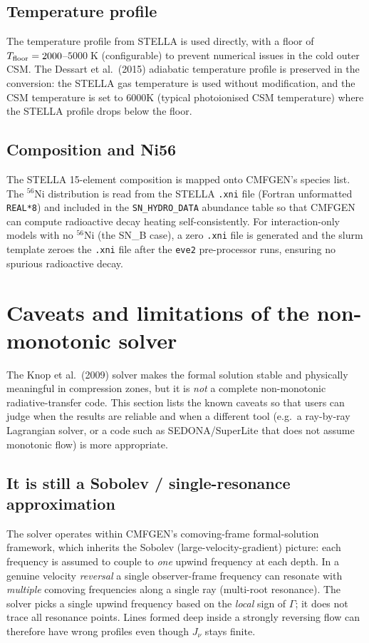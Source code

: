 \documentclass[11pt]{article}
\begin{document}
\subsection{Temperature profile}

The temperature profile from STELLA is used directly, with a floor of
$T_{\rm floor} = 2000$--$5000\;\mathrm{K}$ (configurable) to prevent
numerical issues in the cold outer CSM.  The Dessart et al.\ (2015)
adiabatic temperature profile is preserved in the conversion: the
STELLA gas temperature is used without modification, and the CSM
temperature is set to 6000\;K (typical photoionised CSM temperature)
where the STELLA profile drops below the floor.

\subsection{Composition and Ni56}

The STELLA 15-element composition is mapped onto CMFGEN's species list.
The $^{56}$Ni distribution is read from the STELLA \texttt{.xni} file
(Fortran unformatted \texttt{REAL*8}) and included in the
\texttt{SN\_HYDRO\_DATA} abundance table so that CMFGEN can compute
radioactive decay heating self-consistently.  For interaction-only
models with no $^{56}$Ni (the SN\_B case), a zero \texttt{.xni} file is
generated and the slurm template zeroes the \texttt{.xni} file after the
\texttt{eve2} pre-processor runs, ensuring no spurious radioactive
decay.

\section{Caveats and limitations of the non-monotonic solver}
\label{sec:caveats}

The Knop et al.\ (2009) solver makes the formal solution stable and
physically meaningful in compression zones, but it is \emph{not} a
complete non-monotonic radiative-transfer code.  This section lists the
known caveats so that users can judge when the results are reliable and
when a different tool (e.g.\ a ray-by-ray Lagrangian solver, or a code
such as SEDONA/SuperLite that does not assume monotonic flow) is more
appropriate.

\subsection{It is still a Sobolev / single-resonance approximation}

The solver operates within CMFGEN's comoving-frame formal-solution
framework, which inherits the Sobolev (large-velocity-gradient)
picture: each frequency is assumed to couple to \emph{one} upwind
frequency at each depth.  In a genuine velocity \emph{reversal} a single
observer-frame frequency can resonate with \emph{multiple} comoving
frequencies along a single ray (multi-root resonance).  The solver picks
a single upwind frequency based on the \emph{local} sign of $\Gamma$; it
does not trace all resonance points.  Lines formed deep inside a
strongly reversing flow can therefore have wrong profiles even though
$J_\nu$ stays finite.
\end{document}
